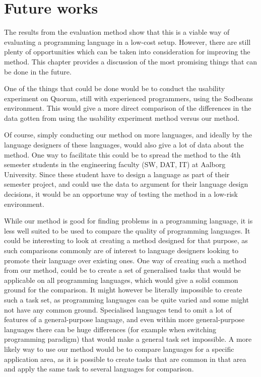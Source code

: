 \chapter{Future works}
\label{chap:further_works}
The results from the evaluation method show that this is a viable way of evaluating a programming language in a low-cost setup. However, there are still plenty of opportunities which can be taken into consideration for improving the method. This chapter provides a discussion of the most promising things that can be done in the future.

One of the things that could be done would be to conduct the usability experiment on Quorum, still with experienced programmers, using the Sodbeans environment.
This would give a more direct comparison of the differences in the data gotten from using the usability experiment method versus our method.

Of course, simply conducting our method on more languages, and ideally by the language designers of these languages, would also give a lot of data about the method.
One way to facilitate this could be to spread the method to the 4th semester students in the engineering faculty (SW, DAT, IT) at Aalborg University.
Since these student have to design a language as part of their semester project, and could use the data to argument for their language design decisions, it would be an opportune way of testing the method in a low-risk environment.

While our method is good for finding problems in a programming language, it is less well suited to be used to compare the quality of programming languages.
It could be interesting to look at creating a method designed for that purpose, as such comparisons commonly are of interest to language designers looking to promote their language over existing ones.
One way of creating such a method from our method, could be to create a set of generalised tasks that would be applicable on all programming languages, which would give a solid common ground for the comparison.
It might however be literally impossible to create such a task set, as programming languages can be quite varied and some might not have any common ground.
Specialised languages tend to omit a lot of features of a general-purpose language, and even within more general-purpose languages there can be huge differences (for example when switching programming paradigm) that would make a general task set impossible.
A more likely way to use our method would be to compare languages for a specific application area, as it is possible to create tasks that are common in that area and apply the same task to several languages for comparison.

